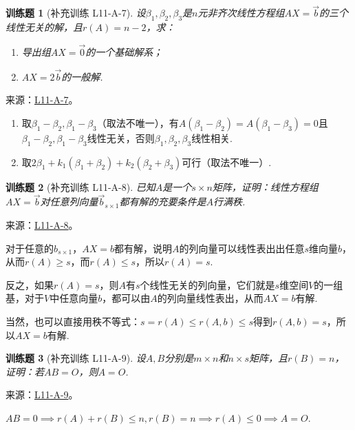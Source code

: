 \documentclass[UTF8,12pt,a4paper,fontset=fandol]{ctexart}
\newtheorem{exercise}{训练题}[section]
\begin{document}
\begin{exercise}[补充训练 L11-A-7]\label{prob:L11-A-7}
设$\beta_1,\beta_2,\beta_3$是$n$元非齐次线性方程组$AX=\vec{b}$的三个线性无关的解，且$r(A)=n-2$，求：
        \begin{enumerate}
            \item 导出组$AX=\vec{0}$的一个基础解系；

            \item $AX=2\vec{b}$的一般解.
        \end{enumerate}
\end{exercise}
\noindent 来源：\href{https://github.com/yhwu-is/Linear-Algebra-Left-Undone/blob/new/%E8%AE%B2%E4%B9%89/%E4%B8%93%E9%A2%98/11%20%E6%9C%9D%E8%8A%B1%E5%A4%95%E6%8B%BE.tex}{L11-A-7}。
\begin{solve}
\begin{enumerate}
                \item 取$\beta_1-\beta_2,\beta_1-\beta_3$（取法不唯一），有$A(\beta_1-\beta_2)=A(\beta_1-\beta_3)=0$且$\beta_1-\beta_2,\beta_1-\beta_3$线性无关，否则$\beta_1,\beta_2,\beta_3$线性相关.

                \item 取$2\beta_1+k_1(\beta_1+\beta_2)+k_2(\beta_2+\beta_3)$可行（取法不唯一）.
            \end{enumerate}
\end{solve}

\begin{exercise}[补充训练 L11-A-8]\label{prob:L11-A-8}
已知$A$是一个$s\times n$矩阵，证明：线性方程组$AX=\vec{b}$对任意列向量$\vec{b}_{s\times 1}$都有解的充要条件是$A$行满秩.
\end{exercise}
\noindent 来源：\href{https://github.com/yhwu-is/Linear-Algebra-Left-Undone/blob/new/%E8%AE%B2%E4%B9%89/%E4%B8%93%E9%A2%98/11%20%E6%9C%9D%E8%8A%B1%E5%A4%95%E6%8B%BE.tex}{L11-A-8}。
\begin{solve}
对于任意的$b_{s\times 1}$，$AX=b$都有解，说明$A$的列向量可以线性表出出任意$s$维向量$b$，从而$r(A)\geqslant s$，而$r(A)\leqslant s$，所以$r(A)=s$.

          反之，如果$r(A)=s$，则$A$有$s$个线性无关的列向量，它们就是$s$维空间$V$的一组基，对于$V$中任意向量$b$，都可以由$A$的列向量线性表出，从而$AX=b$有解.

          当然，也可以直接用秩不等式：$s=r(A)\leqslant r(A,b)\leqslant s$得到$r(A,b)=s$，所以$AX=b$有解.
\end{solve}

\begin{exercise}[补充训练 L11-A-9]\label{prob:L11-A-9}
设$A,B$分别是$m \times n$和$n \times s$矩阵，且$r(B)=n$，证明：若$AB=O$，则$A=O$.
\end{exercise}
\noindent 来源：\href{https://github.com/yhwu-is/Linear-Algebra-Left-Undone/blob/new/%E8%AE%B2%E4%B9%89/%E4%B8%93%E9%A2%98/11%20%E6%9C%9D%E8%8A%B1%E5%A4%95%E6%8B%BE.tex}{L11-A-9}。
\begin{solve}
$AB=0\implies r(A)+r(B)\leqslant n,r(B)=n\implies r(A)\leqslant 0\implies A=O$.
\end{solve}
\end{document}
